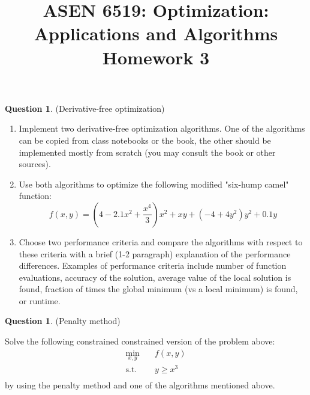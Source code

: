 \documentclass{article}
\title{ASEN 6519: Optimization: Applications and Algorithms\\
       Homework 3}
\theoremstyle{definition}
\newtheorem{question}[thm]{Question}
\begin{document}
\maketitle

\begin{question}(Derivative-free optimization)

    \begin{enumerate}[label=\alph*)]
        \item Implement two derivative-free optimization algorithms. One of the algorithms can be copied from class notebooks or the book, the other should be implemented mostly from scratch (you may consult the book or other sources).
        \item Use both algorithms to optimize the following modified "six-hump camel" function:
        \begin{equation}
            f(x,y) = \left(4 - 2.1x^2 + \frac{x^4}{3}\right)x^2 + xy + \left(-4 + 4y^2\right)y^2 + 0.1y
        \end{equation}
        \item Choose two performance criteria and compare the algorithms with respect to these criteria with a brief (1-2 paragraph) explanation of the performance differences. Examples of performance criteria include number of function evaluations, accuracy of the solution, average value of the local solution is found, fraction of times the global minimum (vs a local minimum) is found, or runtime.
    \end{enumerate}
\end{question}

\begin{question}(Penalty method)

    Solve the following constrained constrained version of the problem above:
    \begin{equation}
        \begin{aligned}
            \min_{x,y} \quad & f(x,y) \\
            \text{s.t.} \quad & y \geq x^3 \\
        \end{aligned}
    \end{equation}
    by using the penalty method and one of the algorithms mentioned above.
\end{question}
\end{document}
